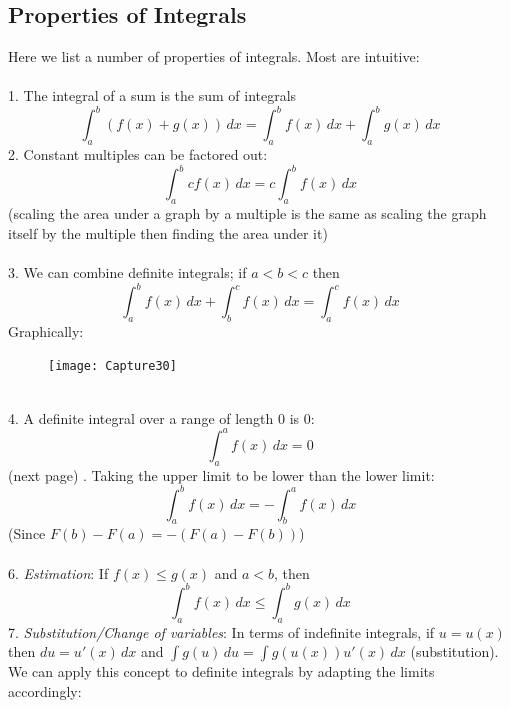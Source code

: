 \documentclass{report}
\begin{document}
\subsection{Properties of Integrals} %
Here we list a number of properties of integrals. Most are intuitive:\\
\vspace{1mm}\\
1. The integral of a sum is the sum of integrals
\begin{equation*}
\int_a^b(f(x)+g(x))\,dx=\int_a^bf(x)\,dx+\int_a^bg(x)\,dx
\end{equation*}
2. Constant multiples can be factored out:
\begin{equation*}
\int_a^bcf(x)\,dx=c\int_a^bf(x)\,dx
\end{equation*}
(scaling the area under a graph by a multiple is the same as scaling the graph
itself by the multiple then finding the area under it)\\
\vspace{1mm}\\
3. We can combine definite integrals; if $a<b<c$ then
\begin{equation*}
\int_a^bf(x)\,dx+\int_b^cf(x)\,dx=\int_a^cf(x)\,dx
\end{equation*}
Graphically:
\begin{figure}[h]
\texttt{[image: Capture30]}\\
\centering
{}
\end{figure}\\
4. A definite integral over a range of length 0 is 0:
\begin{equation*}
\int_a^af(x)\,dx=0
\end{equation*}
(next page)
\newpage
{}. Taking the upper limit to be lower than the lower limit:
\begin{equation*}
\int_a^bf(x)\,dx=-\int_b^af(x)\,dx
\end{equation*}
(Since $F(b)-F(a)=-(F(a)-F(b))$)\\
\vspace{1mm}\\
6. \textit{Estimation}: If $f(x)\leq g(x)$ and $a<b$, then
\begin{equation*}
\int_a^bf(x)\,dx\leq\int_a^bg(x)\,dx
\end{equation*}
7. \textit{Substitution/Change of variables}: In terms of indefinite integrals,
if $u=u(x)$ then $du=u'(x)\,dx$ and 
$\int g(u)\,du=\int g(u(x))u'(x)\,dx$ (substitution).
We can apply this concept to definite integrals by adapting the limits accordingly:
\end{document}
